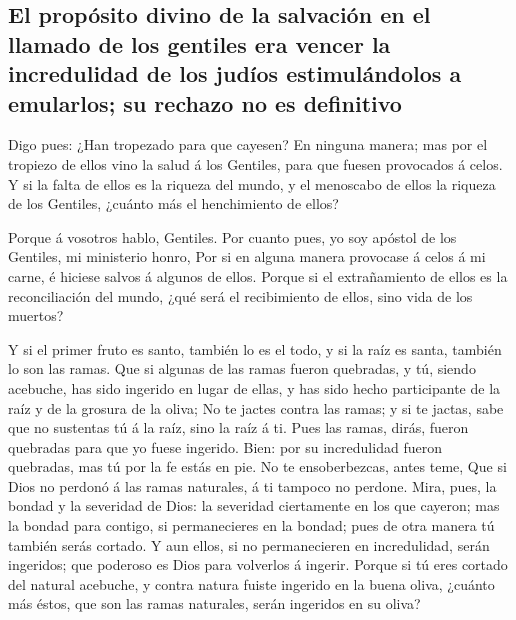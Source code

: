 \hypertarget{el-propuxf3sito-divino-de-la-salvaciuxf3n-en-el-llamado-de-los-gentiles-era-vencer-la-incredulidad-de-los-juduxedos-estimuluxe1ndolos-a-emularlos-su-rechazo-no-es-definitivo}{%
\subsection{El propósito divino de la salvación en el llamado de los
gentiles era vencer la incredulidad de los judíos estimulándolos a
emularlos; su rechazo no es
definitivo}\label{el-propuxf3sito-divino-de-la-salvaciuxf3n-en-el-llamado-de-los-gentiles-era-vencer-la-incredulidad-de-los-juduxedos-estimuluxe1ndolos-a-emularlos-su-rechazo-no-es-definitivo}}

 Digo pues: ¿Han tropezado para que cayesen? En ninguna
manera; mas por el tropiezo de ellos vino la salud á los Gentiles, para
que fuesen provocados á celos.  Y si la falta de ellos es
la riqueza del mundo, y el menoscabo de ellos la riqueza de los
Gentiles, ¿cuánto más el henchimiento de ellos?

 Porque á vosotros hablo, Gentiles. Por cuanto pues, yo soy
apóstol de los Gentiles, mi ministerio honro,  Por si en
alguna manera provocase á celos á mi carne, é hiciese salvos á algunos
de ellos.  Porque si el extrañamiento de ellos es la
reconciliación del mundo, ¿qué será el recibimiento de ellos, sino vida
de los muertos?

 Y si el primer fruto es santo, también lo es el todo, y si
la raíz es santa, también lo son las ramas.  Que si algunas
de las ramas fueron quebradas, y tú, siendo acebuche, has sido ingerido
en lugar de ellas, y has sido hecho participante de la raíz y de la
grosura de la oliva;  No te jactes contra las ramas; y si
te jactas, sabe que no sustentas tú á la raíz, sino la raíz á ti.
 Pues las ramas, dirás, fueron quebradas para que yo fuese
ingerido.  Bien: por su incredulidad fueron quebradas, mas
tú por la fe estás en pie. No te ensoberbezcas, antes teme,
 Que si Dios no perdonó á las ramas naturales, á ti tampoco
no perdone.  Mira, pues, la bondad y la severidad de Dios:
la severidad ciertamente en los que cayeron; mas la bondad para contigo,
si permanecieres en la bondad; pues de otra manera tú también serás
cortado.  Y aun ellos, si no permanecieren en incredulidad,
serán ingeridos; que poderoso es Dios para volverlos á ingerir.
 Porque si tú eres cortado del natural acebuche, y contra
natura fuiste ingerido en la buena oliva, ¿cuánto más éstos, que son las
ramas naturales, serán ingeridos en su oliva?


